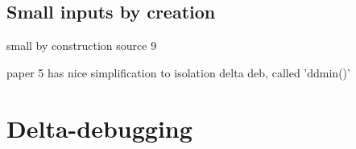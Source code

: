 \cite{bookZellerwhyProgramsFail}
%
\subsection{Small inputs by creation}
small by construction source 9

 paper 5 has nice simplification to isolation delta deb, called 'ddmin()'

\section{Delta-debugging}
\cite{2FuzzingAndDelta-debuggingSMTSolvers}


%
%
%
%

